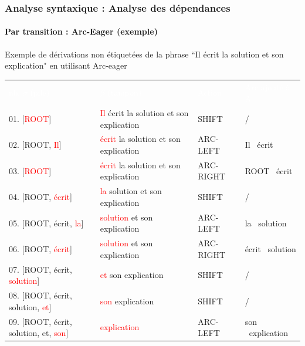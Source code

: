 \documentclass[xcolor=table]{beamer}
\begin{document}
\begin{frame}
\frametitle{Analyse syntaxique : Analyse des dépendances}
\framesubtitle{Par transition : Arc-Eager (exemple)}

\begin{exampleblock}{Exemple de dérivations non étiquetées de la phrase ``Il écrit la solution et son explication" en utilisant Arc-eager}
	\centering\bfseries\fontsize{6}{10}\selectfont
	\begin{tabular}{llll}
		\rowcolor{darkblue}
		\textcolor{white}{nb. $\sigma$ (pile)} & \textcolor{white}{$\beta$ (tampon)} & \textcolor{white}{Action} & \textcolor{white}{Arc ajouté à A} \\
		01. [\textcolor{red}{ROOT}] & \textcolor{red}{Il} écrit la solution et son explication & SHIFT & / \\
		02. [ROOT, \textcolor{red}{Il}] & \textcolor{red}{écrit} la solution et son explication & ARC-LEFT & Il \textleftarrow\ écrit\\
		03. [\textcolor{red}{ROOT}] & \textcolor{red}{écrit} la solution et son explication & ARC-RIGHT & ROOT \textrightarrow\ écrit\\	
		04. [ROOT, \textcolor{red}{écrit}] & \textcolor{red}{la} solution et son explication & SHIFT & / \\	
		05. [ROOT, écrit, \textcolor{red}{la}] & \textcolor{red}{solution} et son explication & ARC-LEFT & la \textleftarrow\ solution \\
		06. [ROOT, \textcolor{red}{écrit}] & \textcolor{red}{solution} et son explication & ARC-RIGHT & écrit \textrightarrow\ solution \\
		07. [ROOT, écrit, \textcolor{red}{solution}] & \textcolor{red}{et} son explication & SHIFT & / \\
		08. [ROOT, écrit, solution, \textcolor{red}{et}] & \textcolor{red}{son} explication & SHIFT & / \\
		09. [ROOT, écrit, solution, et, \textcolor{red}{son}] & \textcolor{red}{explication} & ARC-LEFT & son \textleftarrow\ explication \\

\end{tabular}
\end{exampleblock}
\end{frame}
\end{document}
